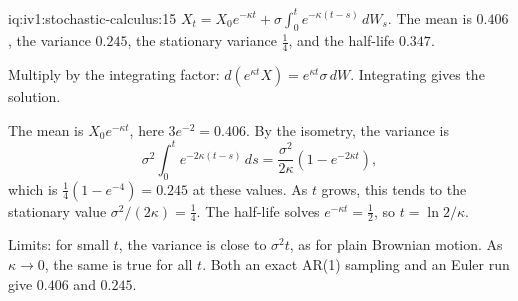 \begin{solution}{iq:iv1:stochastic-calculus:15}
$X_t = X_0e^{-\kappa t} + \sigma\int_0^te^{-\kappa(t - s)}\,dW_s$. The mean is $0.406$, the variance $0.245$, the stationary variance $\frac14$, and the half-life $0.347$.

Multiply by the integrating factor: $d(e^{\kappa t}X) = e^{\kappa t}\sigma\,dW$. Integrating gives the solution.

The mean is $X_0e^{-\kappa t}$, here $3e^{-2} = 0.406$. By the isometry, the variance is
\[
\sigma^2\int_0^te^{-2\kappa(t - s)}\,ds = \frac{\sigma^2}{2\kappa}\left(1 - e^{-2\kappa t}\right),
\]
which is $\frac14(1 - e^{-4}) = 0.245$ at these values. As $t$ grows, this tends to the stationary value $\sigma^2/(2\kappa) = \frac14$. The half-life solves $e^{-\kappa t} = \frac12$, so $t = \ln 2/\kappa$.

Limits: for small $t$, the variance is close to $\sigma^2t$, as for plain Brownian motion. As $\kappa \to 0$, the same is true for all $t$. Both an exact AR(1) sampling and an Euler run give $0.406$ and $0.245$.



\end{solution}

